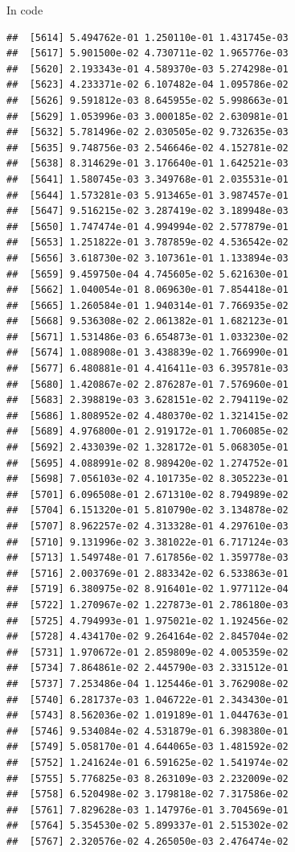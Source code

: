\documentclass[ignorenonframetext,]{beamer}
\begin{document}
\begin{frame}[fragile]{In code}
\begin{verbatim}
##  [5614] 5.494762e-01 1.250110e-01 1.431745e-03
##  [5617] 5.901500e-02 4.730711e-02 1.965776e-03
##  [5620] 2.193343e-01 4.589370e-03 5.274298e-01
##  [5623] 4.233371e-02 6.107482e-04 1.095786e-02
##  [5626] 9.591812e-03 8.645955e-02 5.998663e-01
##  [5629] 1.053996e-03 3.000185e-02 2.630981e-01
##  [5632] 5.781496e-02 2.030505e-02 9.732635e-03
##  [5635] 9.748756e-03 2.546646e-02 4.152781e-02
##  [5638] 8.314629e-01 3.176640e-01 1.642521e-03
##  [5641] 1.580745e-03 3.349768e-01 2.035531e-01
##  [5644] 1.573281e-03 5.913465e-01 3.987457e-01
##  [5647] 9.516215e-02 3.287419e-02 3.189948e-03
##  [5650] 1.747474e-01 4.994994e-02 2.577879e-01
##  [5653] 1.251822e-01 3.787859e-02 4.536542e-02
##  [5656] 3.618730e-02 3.107361e-01 1.133894e-03
##  [5659] 9.459750e-04 4.745605e-02 5.621630e-01
##  [5662] 1.040054e-01 8.069630e-01 7.854418e-01
##  [5665] 1.260584e-01 1.940314e-01 7.766935e-02
##  [5668] 9.536308e-02 2.061382e-01 1.682123e-01
##  [5671] 1.531486e-03 6.654873e-01 1.033230e-02
##  [5674] 1.088908e-01 3.438839e-02 1.766990e-01
##  [5677] 6.480881e-01 4.416411e-03 6.395781e-03
##  [5680] 1.420867e-02 2.876287e-01 7.576960e-01
##  [5683] 2.398819e-03 3.628151e-02 2.794119e-02
##  [5686] 1.808952e-02 4.480370e-02 1.321415e-02
##  [5689] 4.976800e-01 2.919172e-01 1.706085e-02
##  [5692] 2.433039e-02 1.328172e-01 5.068305e-01
##  [5695] 4.088991e-02 8.989420e-02 1.274752e-01
##  [5698] 7.056103e-02 4.101735e-02 8.305223e-01
##  [5701] 6.096508e-01 2.671310e-02 8.794989e-02
##  [5704] 6.151320e-01 5.810790e-02 3.134878e-02
##  [5707] 8.962257e-02 4.313328e-01 4.297610e-03
##  [5710] 9.131996e-02 3.381022e-01 6.717124e-03
##  [5713] 1.549748e-01 7.617856e-02 1.359778e-03
##  [5716] 2.003769e-01 2.883342e-02 6.533863e-01
##  [5719] 6.380975e-02 8.916401e-02 1.977112e-04
##  [5722] 1.270967e-02 1.227873e-01 2.786180e-03
##  [5725] 4.794993e-01 1.975021e-02 1.192456e-02
##  [5728] 4.434170e-02 9.264164e-02 2.845704e-02
##  [5731] 1.970672e-01 2.859809e-02 4.005359e-02
##  [5734] 7.864861e-02 2.445790e-03 2.331512e-01
##  [5737] 7.253486e-04 1.125446e-01 3.762908e-02
##  [5740] 6.281737e-03 1.046722e-01 2.343430e-01
##  [5743] 8.562036e-02 1.019189e-01 1.044763e-01
##  [5746] 9.534084e-02 4.531879e-01 6.398380e-01
##  [5749] 5.058170e-01 4.644065e-03 1.481592e-02
##  [5752] 1.241624e-01 6.591625e-02 1.541974e-02
##  [5755] 5.776825e-03 8.263109e-03 2.232009e-02
##  [5758] 6.520498e-02 3.179818e-02 7.317586e-02
##  [5761] 7.829628e-03 1.147976e-01 3.704569e-01
##  [5764] 5.354530e-02 5.899337e-01 2.515302e-02
##  [5767] 2.320576e-02 4.265050e-03 2.476474e-02

\end{verbatim}
\end{frame}
\end{document}
